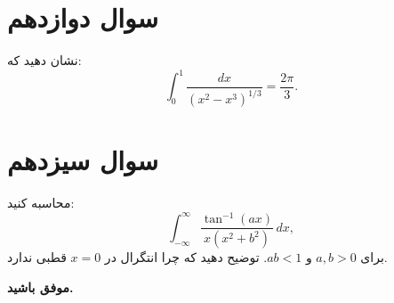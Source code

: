 \documentclass[a4paper,16pt]{article}
\begin{document}
	\section{سوال دوازدهم}
	نشان دهید که:
	\[
	\int_0^1 \frac{dx}{(x^2 - x^3)^{1/3}} = \frac{2\pi}{3}.
	\]  
	\section{سوال سیزدهم}
	محاسبه کنید:
	\[
	\int_{-\infty}^\infty \frac{\tan^{-1}(ax)}{x(x^2 + b^2)}\, dx,
	\]  
	برای \(a, b > 0\) و \(ab < 1\).  
	توضیح دهید که چرا انتگرال در \(x = 0\) ‌قطبی ندارد.
	
	\vspace{10pt}
	\textbf{موفق باشید.}
\end{document}
